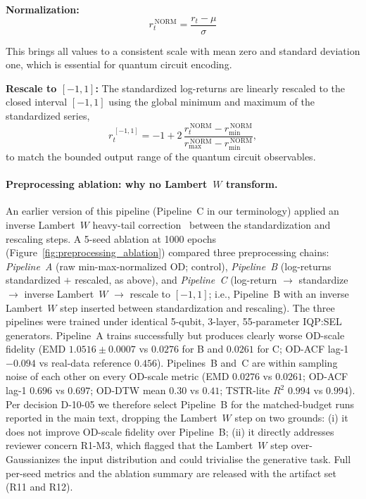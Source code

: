 \textbf{Normalization:}
\begin{equation}
 r_t^{\,\text{NORM}} = \frac{r_t - \mu}{\sigma}
 \label{eq:normalization_s9}
\end{equation}

This brings all values to a consistent scale with mean zero and standard deviation one, which is essential for quantum circuit encoding.

\textbf{Rescale to $[-1, 1]$:} The standardized log-returns are linearly
rescaled to the closed interval $[-1, 1]$ using the global minimum and maximum
of the standardized series,
\begin{equation}
 r_t^{\,[-1,1]} = -1 + 2\,
 \frac{r_t^{\,\text{NORM}} - r_\text{min}^{\,\text{NORM}}}
 {r_\text{max}^{\,\text{NORM}} - r_\text{min}^{\,\text{NORM}}},
 \label{eq:rescale_pm1_s9}
\end{equation}
to match the bounded output range of the quantum circuit observables.

\paragraph{Preprocessing ablation: why no Lambert~$W$ transform.}
An earlier version of this pipeline (Pipeline~C in our terminology) applied
an inverse Lambert~$W$ heavy-tail correction~\cite{goerg2015lambert} between
the standardization and rescaling steps. A 5-seed ablation at 1000 epochs
(Figure~\ref{fig:preprocessing_ablation}) compared three preprocessing
chains: \emph{Pipeline~A} (raw min-max-normalized OD; control),
\emph{Pipeline~B} (log-returns standardized $+$ rescaled, as above), and
\emph{Pipeline~C} (log-return $\to$ standardize $\to$ inverse
Lambert~$W$ $\to$ rescale to $[-1, 1]$; i.e., Pipeline~B with an
inverse Lambert~$W$ step inserted between standardization and
rescaling). The three
pipelines were trained under identical 5-qubit, 3-layer, 55-parameter
IQP:SEL generators. Pipeline~A trains successfully but produces clearly
worse OD-scale fidelity (EMD $1.0516 \pm 0.0007$ vs $0.0276$ for B and
$0.0261$ for C; OD-ACF lag-1 $-0.094$ vs real-data reference $0.456$).
Pipelines~B and~C are within sampling noise of each other on every
OD-scale metric (EMD $0.0276$ vs $0.0261$; OD-ACF lag-1 $0.696$ vs
$0.697$; OD-DTW mean $0.30$ vs $0.41$; TSTR-lite $R^2$ $0.994$ vs
$0.994$). Per decision D-10-05 we therefore select Pipeline~B for the
matched-budget runs reported in the main text, dropping the Lambert~$W$
step on two grounds: (i) it does not improve OD-scale fidelity over
Pipeline~B; (ii) it directly addresses reviewer concern R1-M3, which
flagged that the Lambert~$W$ step over-Gaussianizes the input
distribution and could trivialise the generative task. Full per-seed
metrics and the ablation summary are released with the artifact set
(R11 and R12).

